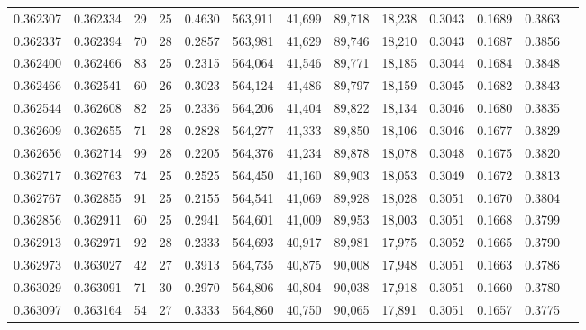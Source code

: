 \begin{tabular}{rrrrrrrrrrrrr}
0.362307 & 0.362334 &    29 &  25 &                                     0.4630 & 563,911 &  41,699 &  89,718 &  18,238 & 0.3043 & 0.1689 & 0.3863 \\
0.362337 & 0.362394 &    70 &  28 &                                     0.2857 & 563,981 &  41,629 &  89,746 &  18,210 & 0.3043 & 0.1687 & 0.3856 \\
0.362400 & 0.362466 &    83 &  25 &                                     0.2315 & 564,064 &  41,546 &  89,771 &  18,185 & 0.3044 & 0.1684 & 0.3848 \\
0.362466 & 0.362541 &    60 &  26 &                                     0.3023 & 564,124 &  41,486 &  89,797 &  18,159 & 0.3045 & 0.1682 & 0.3843 \\
0.362544 & 0.362608 &    82 &  25 &                                     0.2336 & 564,206 &  41,404 &  89,822 &  18,134 & 0.3046 & 0.1680 & 0.3835 \\
0.362609 & 0.362655 &    71 &  28 &                                     0.2828 & 564,277 &  41,333 &  89,850 &  18,106 & 0.3046 & 0.1677 & 0.3829 \\
0.362656 & 0.362714 &    99 &  28 &                                     0.2205 & 564,376 &  41,234 &  89,878 &  18,078 & 0.3048 & 0.1675 & 0.3820 \\
0.362717 & 0.362763 &    74 &  25 &                                     0.2525 & 564,450 &  41,160 &  89,903 &  18,053 & 0.3049 & 0.1672 & 0.3813 \\
0.362767 & 0.362855 &    91 &  25 &                                     0.2155 & 564,541 &  41,069 &  89,928 &  18,028 & 0.3051 & 0.1670 & 0.3804 \\
0.362856 & 0.362911 &    60 &  25 &                                     0.2941 & 564,601 &  41,009 &  89,953 &  18,003 & 0.3051 & 0.1668 & 0.3799 \\
0.362913 & 0.362971 &    92 &  28 &                                     0.2333 & 564,693 &  40,917 &  89,981 &  17,975 & 0.3052 & 0.1665 & 0.3790 \\
0.362973 & 0.363027 &    42 &  27 &                                     0.3913 & 564,735 &  40,875 &  90,008 &  17,948 & 0.3051 & 0.1663 & 0.3786 \\
0.363029 & 0.363091 &    71 &  30 &                                     0.2970 & 564,806 &  40,804 &  90,038 &  17,918 & 0.3051 & 0.1660 & 0.3780 \\
0.363097 & 0.363164 &    54 &  27 &                                     0.3333 & 564,860 &  40,750 &  90,065 &  17,891 & 0.3051 & 0.1657 & 0.3775 \\

\end{tabular}
